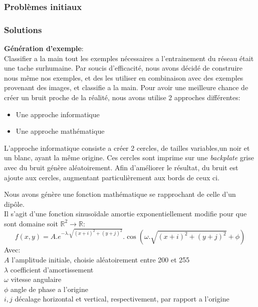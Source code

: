 \documentclass[a4paper, 12pt, titlepage, oneside, french]{article}
\begin{document}
	\subsubsection{Problèmes initiaux}
	\subsubsection{Solutions}
	\textbf{Génération d'exemple}:\\
	Classifier a la main tout les exemples nécessaires a l'entrainement du réseau était une tache surhumaine. Par soucis d'efficacité, nous avons décidé de construire nous même
	nos exemples, et des les utiliser en combinaison avec des exemples provenant des images, et classifie a la main.
	Pour avoir une meilleure chance de créer un bruit proche de la réalité, nous avons utilise 2 approches différentes:
	\begin{itemize}
		\item Une approche informatique
		\item Une approche mathématique
	\end{itemize}
	L'approche informatique consiste a créer 2 cercles, de tailles variables,un noir et un blanc, ayant la même origine. Ces cercles sont imprime sur une \textit{backplate} grise avec du bruit génère aléatoirement. Afin d'améliorer le résultat, du bruit est ajoute aux cercles, augmentant particulièrement aux bords de ceux ci.

	Nous avons génère une fonction mathématique se rapprochant de celle d'un dipôle.\\
	Il s'agit d'une fonction sinusoïdale amortie exponentiellement modifie pour que sont domaine soit $\mathbb{R}^2 \to \mathbb{R}$:
	\[f(x,y) = A.e^{-\lambda . \sqrt{(x+i)^2+(y+j)^2}}.\cos(\omega . \sqrt{(x+i)^2+(y+j)^2} + \phi)\]
	Avec:\\
	\indent $A$ l'amplitude initiale, choisie aléatoirement entre 200 et 255\\
	\indent$\lambda$ coefficient d'amortissement\\
	\indent$\omega$ vitesse angulaire\\
	\indent$\phi$ angle de phase a l'origine\\
	\indent$i,j$ décalage horizontal et vertical, respectivement, par rapport a l'origine
\end{document}
